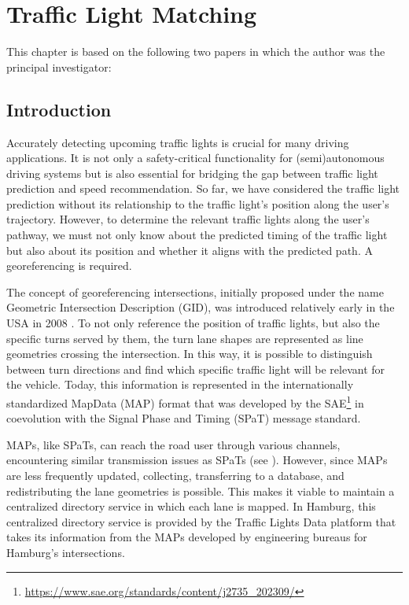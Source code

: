 \chapter{Traffic Light Matching}\label{ch:matching}

\begin{Summary}
This chapter is based on the following two papers in which the author was the principal investigator: 

\cite{matthes2022matching} 

\cite{matthes2023geo} 
\end{Summary}

\section{Introduction}

Accurately detecting upcoming traffic lights is crucial for many driving applications. It is not only a safety-critical functionality for (semi)autonomous driving systems but is also essential for bridging the gap between traffic light prediction and speed recommendation. So far, we have considered the traffic light prediction without its relationship to the traffic light's position along the user's trajectory. However, to determine the relevant traffic lights along the user's pathway, we must not only know about the predicted timing of the traffic light but also about its position and whether it aligns with the predicted path. A georeferencing is required.

The concept of georeferencing intersections, initially proposed under the name Geometric Intersection Description (GID), was introduced relatively early in the USA in 2008 \cite{cicas-v}. To not only reference the position of traffic lights, but also the specific turns served by them, the turn lane shapes are represented as line geometries crossing the intersection. In this way, it is possible to distinguish between turn directions and find which specific traffic light will be relevant for the vehicle. Today, this information is represented in the internationally standardized MapData (MAP) format that was developed by the SAE\footnote{\url{https://www.sae.org/standards/content/j2735_202309/}} in coevolution with the Signal Phase and Timing (SPaT) message standard.

MAPs, like SPaTs, can reach the road user through various channels, encountering similar transmission issues as SPaTs (see ). However, since MAPs are less frequently updated, collecting, transferring to a database, and redistributing the lane geometries is possible. This makes it viable to maintain a centralized directory service in which each lane is mapped. In Hamburg, this centralized directory service is provided by the Traffic Lights Data platform that takes its information from the MAPs developed by engineering bureaus for Hamburg's intersections.

